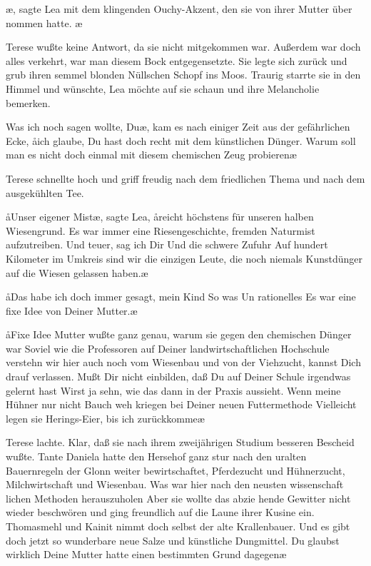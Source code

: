 \aanah{}\ae, sagte Lea mit dem
klingenden Ouchy-Akzent, den sie von ihrer Mutter über\-%
nommen hatte. \aanah{}\ae

Terese wußte keine Antwort, da sie nicht mitgekommen war.
Außerdem war doch alles verkehrt, war man diesem Bock
entgegensetzte. Sie legte sich zurück und grub ihren semmel\-%
blonden Nüllschen Schopf ins Moos. Traurig starrte sie in
den Himmel und wünschte, Lea möchte auf sie schaun und ihre
Melancholie bemerken.

\aanah Was ich noch sagen wollte, Du\ae, kam es nach einiger Zeit aus
der gefährlichen Ecke, \aa ich glaube, Du hast doch recht mit dem
künstlichen Dünger. Warum soll man es nicht doch einmal mit
diesem chemischen Zeug probieren\frag\ae

Terese schnellte hoch und griff freudig nach dem friedlichen
Thema und nach dem ausgekühlten Tee.

\aa Unser eigener Mist\ae, sagte Lea, \aa reicht höchstens für unseren
halben Wiesengrund. Es war immer eine Riesengeschichte,
fremden Naturmist aufzutreiben. Und teuer, sag ich Dir\ausr{}
Und die schwere Zufuhr\ausr{} Auf hundert Kilometer im Umkreis
sind wir die einzigen Leute, die noch niemals Kunstdünger
auf die Wiesen gelassen haben.\ae

\aa Das habe ich doch immer gesagt, mein Kind\ausr{} So was Un\-%
rationelles\ausr{} Es war eine fixe Idee von Deiner Mutter.\ae

\aa Fixe Idee\ausr{} Mutter wußte ganz genau, warum sie gegen
den chemischen Dünger war\ausr{} Soviel wie die Professoren auf
Deiner landwirtschaftlichen Hochschule verstehn wir hier
auch noch vom Wiesenbau und von der Viehzucht, kannst Dich
drauf verlassen. Mußt Dir nicht einbilden, daß Du auf Deiner
Schule irgendwas gelernt hast\ausr{} Wirst ja sehn, wie das dann
in der Praxis aussieht. Wenn meine Hühner nur nicht Bauch\-%
weh kriegen bei Deiner neuen Futtermethode\ausr{} Vielleicht
legen sie Herings-Eier, bis ich zurückkomme\frag\ae

Terese lachte. Klar, daß sie nach ihrem zweijährigen Studium
besseren Bescheid wußte. Tante Daniela hatte den Hersehof
ganz stur nach den uralten Bauernregeln der Glonn weiter\-%
bewirtschaftet, Pferdezucht und Hühnerzucht, Milchwirtschaft
und Wiesenbau. Was war hier nach den neusten wissenschaft\-%
lichen Methoden herauszuholen\ausr{} Aber sie wollte das abzie\-%
hende Gewitter nicht wieder beschwören und ging freundlich
auf die Laune ihrer Kusine ein. \aanah Thomasmehl und Kainit
nimmt doch selbst der alte Krallenbauer. Und es gibt doch
jetzt so wunderbare neue Salze und künstliche Dungmittel.
Du glaubst wirklich Deine Mutter hatte einen bestimmten
Grund dagegen\frag\ae

